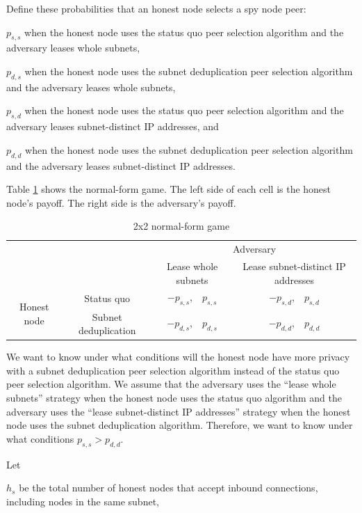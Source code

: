 \documentclass[usletter,11pt,english,openany]{article}
\begin{document}
Define these probabilities that an honest node selects a spy node
peer:

$p_{s,s}$ when the honest node uses the status quo peer selection
algorithm and the adversary leases whole subnets,

$p_{d,s}$ when the honest node uses the subnet deduplication peer
selection algorithm and the adversary leases whole subnets,

$p_{s,d}$ when the honest node uses the status quo peer selection
algorithm and the adversary leases subnet-distinct IP addresses, and

$p_{d,d}$ when the honest node uses the subnet deduplication peer
selection algorithm and the adversary leases subnet-distinct IP addresses.

Table \ref{table-normal-form-game} shows the normal-form game. The
left side of each cell is the honest node's payoff. The right side
is the adversary's payoff.

\begin{table}

\caption{2x2 normal-form game}

\label{table-normal-form-game}

\begin{tabular}{|c|c|c|c|}
\cline{3-4} \cline{4-4} 
\multicolumn{1}{c}{} &  & \multicolumn{2}{c|}{Adversary}\tabularnewline
\cline{3-4} \cline{4-4} 
\multicolumn{1}{c}{} &  & Lease whole subnets & Lease subnet-distinct IP addresses\tabularnewline
\hline 
\multirow{2}{*}{Honest node} & Status quo & $-p_{s,s}$,$\quad$$p_{s,s}$ & $-p_{s,d}$,$\quad$$p_{s,d}$\tabularnewline
\cline{2-4} \cline{3-4} \cline{4-4} 
 & Subnet deduplication & $-p_{d,s}$,$\quad$$p_{d,s}$ & $-p_{d,d}$,$\quad$$p_{d,d}$\tabularnewline
\hline 
\end{tabular}

\end{table}

We want to know under what conditions will the honest node have more
privacy with a subnet deduplication peer selection algorithm instead
of the status quo peer selection algorithm. We assume that the adversary
uses the ``lease whole subnets'' strategy when the honest node uses
the status quo algorithm and the adversary uses the ``lease subnet-distinct
IP addresses'' strategy when the honest node uses the subnet deduplication
algorithm. Therefore, we want to know under what conditions $p_{s,s}>p_{d,d}$.

Let

$h_{s}$ be the total number of honest nodes that accept inbound connections,
including nodes in the same subnet,
\end{document}
